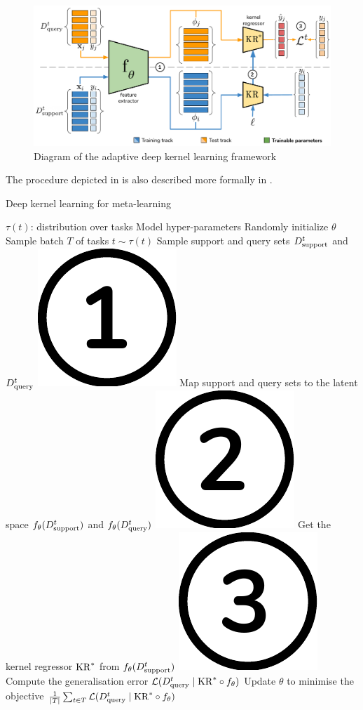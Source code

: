 \documentclass[11pt]{article}
\numberwithin{equation}{subsection}
\begin{document}
\begin{figure}[ht]
  \includegraphics[width=.9\textwidth,center]{adkl/dkl-meta}
  \caption{Diagram of the adaptive deep kernel learning framework}
  \label{fig:dkl-meta}
\end{figure}

The procedure depicted in  is also described more formally in .

\begin{algorithm}[ht]
  \caption{Deep kernel learning for meta-learning}
  \label{algo:dkl}
  \begin{algorithmic}[1]
    \REQUIRE $\tau(t)$: distribution over tasks
    \REQUIRE Model hyper-parameters
    \STATE Randomly initialize $\theta$
      \STATE Sample batch $T$ of tasks $t \sim \tau(t)$
        \STATE Sample support and query sets ${D_{\mathrm{support}}^t}$ and ${D_{\mathrm{query}}^t}$
        \STATE \includegraphics[height=.35cm]{adkl/numbers/1} Map support and query sets to the latent space $f_\theta({D_{\mathrm{support}}^t})$ and $f_\theta({D_{\mathrm{query}}^t})$
        \STATE \includegraphics[height=.35cm]{adkl/numbers/2} Get the kernel regressor $\mathrm{KR}^*$ from $f_\theta({D_{\mathrm{support}}^t})$
        \STATE \includegraphics[height=.35cm]{adkl/numbers/3} Compute the generalisation error $\mathcal{L}({D_{\mathrm{query}}^t} \mid \mathrm{KR}^* \circ f_\theta)$
      \ENDFOR
      \STATE Update $\theta$ to minimise the objective $\frac{1}{|T|} \sum_{t \in T}  \mathcal{L}({D_{\mathrm{query}}^t} \mid \mathrm{KR}^* \circ f_\theta)$
    \ENDWHILE
  \end{algorithmic}
\end{algorithm}

%
\end{document}
